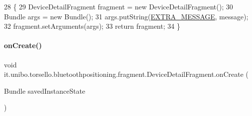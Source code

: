 \begin{DoxyCode}
28                                                                    \{
29         DeviceDetailFragment fragment = \textcolor{keyword}{new} DeviceDetailFragment();
30         Bundle args = \textcolor{keyword}{new} Bundle();
31         args.putString(\hyperlink{classit_1_1unibo_1_1torsello_1_1bluetoothpositioning_1_1fragment_1_1DeviceDetailFragment_a9f7fff4a2b22105976f2c7223d88f9ae_a9f7fff4a2b22105976f2c7223d88f9ae}{EXTRA\_MESSAGE}, message);
32         fragment.setArguments(args);
33         \textcolor{keywordflow}{return} fragment;
34     \}
\end{DoxyCode}
\hypertarget{classit_1_1unibo_1_1torsello_1_1bluetoothpositioning_1_1fragment_1_1DeviceDetailFragment_af33d782c107be10fe752f16f04cc5e5d_af33d782c107be10fe752f16f04cc5e5d}{}\label{classit_1_1unibo_1_1torsello_1_1bluetoothpositioning_1_1fragment_1_1DeviceDetailFragment_af33d782c107be10fe752f16f04cc5e5d_af33d782c107be10fe752f16f04cc5e5d} 
\paragraph{\texorpdfstring{on\+Create()}{onCreate()}}
{\footnotesize\ttfamily void it.\+unibo.\+torsello.\+bluetoothpositioning.\+fragment.\+Device\+Detail\+Fragment.\+on\+Create (\begin{DoxyParamCaption}\item[{Bundle}]{saved\+Instance\+State }\end{DoxyParamCaption})}


